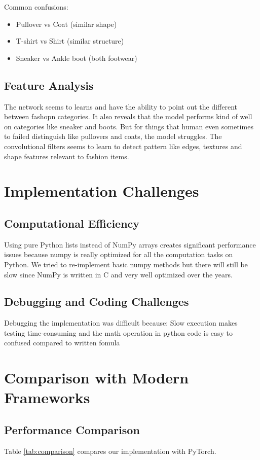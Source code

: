 \documentclass[conference]{IEEEtran}
\begin{document}
Common confusions:
\begin{itemize}
    \item Pullover vs Coat (similar shape)
    \item T-shirt vs Shirt (similar structure)
    \item Sneaker vs Ankle boot (both footwear)
\end{itemize}

\subsection{Feature Analysis}
The network seems to learns and have the ability to point out the different between fashopn categories. It also reveals that the model performs kind of well on categories like sneaker and boots. But for things that human even sometimes to failed distinguish like pullovers and coats, the model struggles. The convolutional filters seems to learn to detect pattern like edges, textures and shape features relevant to fashion items.

\section{Implementation Challenges}

\subsection{Computational Efficiency}
Using pure Python lists instead of NumPy arrays creates significant performance issues because numpy is really optimized for all the computation tasks on Python. We tried to re-implement basic numpy methods but there will still be slow since NumPy is written in C and very well optimized over the years.

\subsection{Debugging and Coding Challenges}
Debugging the implementation was difficult because: Slow execution makes testing time-consuming
 and the math operation in python code is easy to confused compared to written fomula

\section{Comparison with Modern Frameworks}

\subsection{Performance Comparison}
Table \ref{tab:comparison} compares our implementation with PyTorch.
\end{document}
